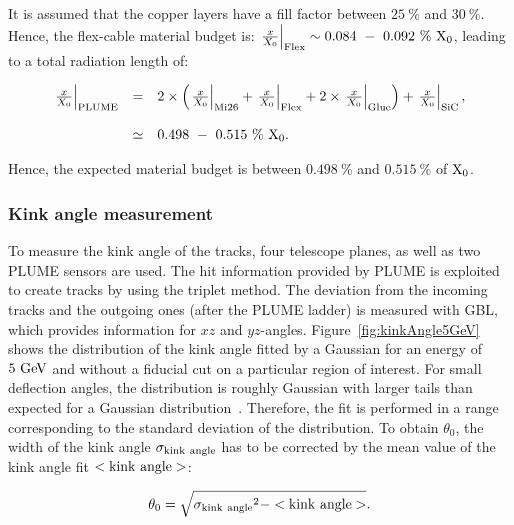      It is assumed that the copper layers have a fill factor between $25~\%$ and $30~\%$.
     Hence, the flex-cable material budget is: $\left. \frac{x}{X_0} \right|_{\rm{Flex}} \sim 0.084~-~0.092~\%~\rm{X_0}$, leading to a total radiation length of:

     \begin{equation}
       \begin{array}{lcl}
         \left. \frac{x}{X_0} \right|_{\rm{PLUME}} & = & 2 \times \left( \left. \frac{x}{X_0} \right|_{\rm{Mi26}} + \left. \frac{x}{X_0} \right|_{\rm{Flex}} + 2 \times \left. \frac{x}{X_0} \right|_{\rm{Glue}}\right) + \left. \frac{x}{X_0} \right|_{\rm{SiC}}, \\
         \\
         & \simeq & 0.498~-~0.515~\%~\rm{X_0}.
       \end{array}
       \label{eq:X0_theory}
     \end{equation}

     Hence, the expected material budget is between $0.498~\%$ and $0.515~\%$ of $\rm{X_0}$.

     \subsubsection{Kink angle measurement}

   To measure the kink angle of the tracks, four telescope planes, as well as two \gls{PLUME} sensors are used.
   The hit information provided by \gls{PLUME} is exploited to create tracks by using the triplet method.
   The deviation from the incoming tracks and the outgoing ones (after the \gls{PLUME} ladder) is measured with \gls{GBL}, which provides information for $xz$ and $yz$-angles.
   Figure~\ref{fig:kinkAngle5GeV} shows the distribution of the kink angle fitted by a Gaussian for an energy of $5~\rm{GeV}$ and without a fiducial cut on a particular region of interest.
   For small deflection angles, the distribution is roughly Gaussian with larger tails than expected for a Gaussian distribution~\cite{Agashe:2014kda}.
   Therefore, the fit is performed in a range corresponding to the standard deviation of the distribution.
   To obtain $\theta_0$, the width of the kink angle $\rm{\sigma_{kink~angle}}$ has to be corrected by the mean value of the kink angle fit $<\rm{kink~angle}>$:
   
   \begin{equation}
     \theta_0 = \sqrt{\rm{\sigma_{kink~angle}}^2 - <\rm{kink~angle}>}.
     \label{eq:kink}
   \end{equation}
   
